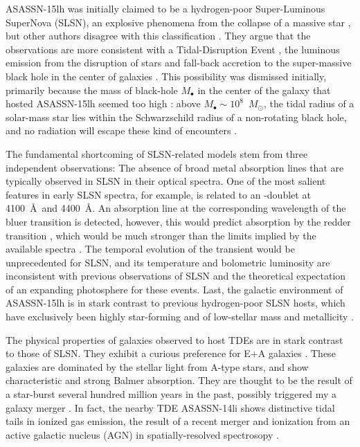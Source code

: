 \documentclass[traditabstract]{aa}
\newcommand{\Msun}{$M_\odot$}
\begin{document}
ASASSN-15lh was initially claimed \citep[][]{2016Sci...351..257D, 2017MNRAS.466.1428G} to be a hydrogen-poor Super-Luminous SuperNova (SLSN), an explosive phenomena from the collapse of a massive star \citep{2011Natur.474..487Q}, but other authors disagree with this classification \citep{2016NatAs...1E...2L,  2017ApJ...836...25M}. They argue that the observations are more consistent with a Tidal-Disruption Event \citep[TDEs, e.g.,][]{2015JHEAp...7..148K}, the luminous emission from the disruption of stars and fall-back accretion to the super-massive black hole in the center of galaxies \citep{1988Natur.333..523R, 1989ApJ...346L..13E}. This possibility was dismissed initially, primarily because the mass of black-hole $M_\bullet$ in the center of the galaxy that hosted ASASSN-15lh seemed too high \citep{2015ATel.7776....1P}: above $M_\bullet\sim10^{8}$~\Msun, the tidal radius of a solar-mass star lies within the Schwarzschild radius of a non-rotating black hole, and no radiation will escape these kind of encounters \citep{1975Natur.254..295H}.

The fundamental shortcoming of SLSN-related models stem from three independent observations: The absence of broad metal absorption lines that are typically observed in SLSN in their optical spectra. One of the most salient features in early SLSN spectra, for example, is related to an -doublet at 4100~\AA~and 4400~\AA \citep{2011Natur.474..487Q}. An absorption line at the corresponding wavelength of the bluer  transition is detected, however, this would predict absorption by the redder transition \citep{2016MNRAS.458.3455M}, which would be much stronger than the limits implied by the available spectra \citep{2016NatAs...1E...2L, 2017ApJ...836...25M}. The temporal evolution of the transient would be unprecedented for SLSN, and its temperature and bolometric luminosity are inconsistent with previous observations of SLSN and the theoretical expectation of an expanding photosphere for these events. Last, the galactic environment of ASASSN-15lh is in stark contrast to previous hydrogen-poor SLSN hosts, which have exclusively been highly star-forming and of low-stellar mass and metallicity \citep{2015MNRAS.449..917L, 2016ApJ...830...13P, 2016arXiv160504925C}.

The physical properties of galaxies observed to host TDEs are in stark contrast to those of SLSN. They exhibit a curious preference  \citep{2014ApJ...793...38A, 2016ApJ...818L..21F} for E+A galaxies \citep{1996ApJ...466..104Z}. These galaxies are dominated by the stellar light from A-type stars, and show characteristic and strong Balmer absorption. They are thought to be the result of a star-burst several hundred million years in the past, possibly triggered my a galaxy merger \citep{1996ApJ...466..104Z}. In fact, the nearby TDE ASASSN-14li shows distinctive tidal tails in ionized gas emission, the result of a recent merger and ionization from an active galactic nucleus (AGN) in spatially-resolved spectrosopy \citep{2016ApJ...830L..32P}.
\end{document}
